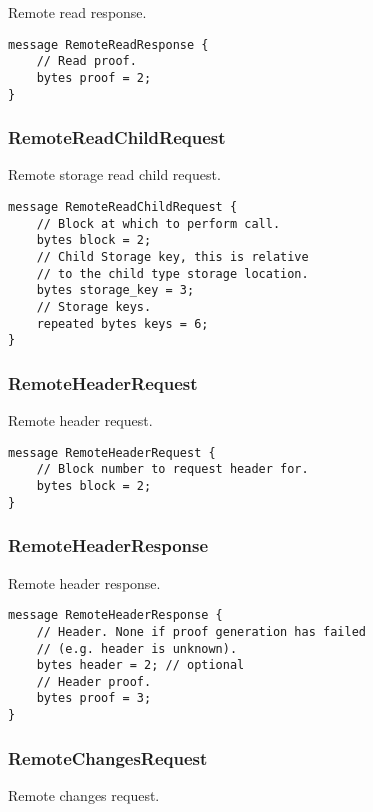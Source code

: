 \documentclass{book}
\begin{document}
Remote read response.

\begin{lstlisting}[frame=single]
message RemoteReadResponse {
    // Read proof.
    bytes proof = 2;
}
\end{lstlisting}

\subsubsection{RemoteReadChildRequest}

Remote storage read child request.

\begin{lstlisting}[frame=single]
message RemoteReadChildRequest {
    // Block at which to perform call.
    bytes block = 2;
    // Child Storage key, this is relative
    // to the child type storage location.
    bytes storage_key = 3;
    // Storage keys.
    repeated bytes keys = 6;
}
\end{lstlisting}

\subsubsection{RemoteHeaderRequest}

Remote header request.

\begin{lstlisting}[frame=single]
message RemoteHeaderRequest {
    // Block number to request header for.
    bytes block = 2;
}
\end{lstlisting}

\subsubsection{RemoteHeaderResponse}

Remote header response.

\begin{lstlisting}[frame=single]
message RemoteHeaderResponse {
    // Header. None if proof generation has failed
    // (e.g. header is unknown).
    bytes header = 2; // optional
    // Header proof.
    bytes proof = 3;
}
\end{lstlisting}

\subsubsection{RemoteChangesRequest}

Remote changes request.
\end{document}

